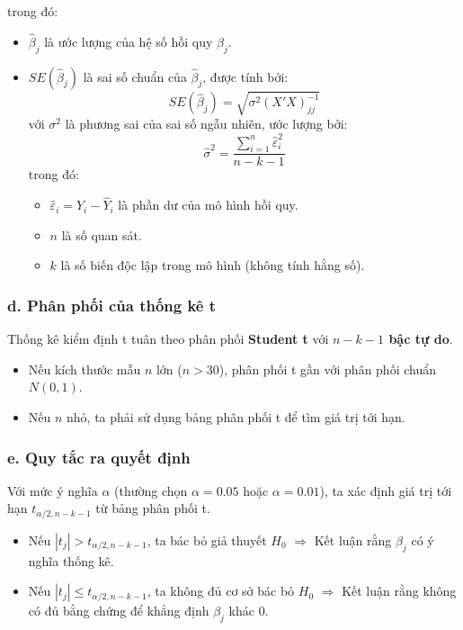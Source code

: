 trong đó:

\begin{itemize}
    \item $\hat{\beta}_j$ là ước lượng của hệ số hồi quy $\beta_j$.
    \item $SE(\hat{\beta}_j)$ là sai số chuẩn của $\hat{\beta}_j$, được tính bởi:
    \begin{equation}
        SE(\hat{\beta}_j) = \sqrt{\sigma^2 (X'X)^{-1}_{jj}}
    \end{equation}
    với $\sigma^2$ là phương sai của sai số ngẫu nhiên, ước lượng bởi:
    \begin{equation}
        \hat{\sigma}^2 = \frac{\sum_{i=1}^{n} \hat{\varepsilon}_i^2}{n - k - 1}
    \end{equation}
    trong đó:
    \begin{itemize}
        \item $\hat{\varepsilon}_i = Y_i - \hat{Y}_i$ là phần dư của mô hình hồi quy.
        \item $n$ là số quan sát.
        \item $k$ là số biến độc lập trong mô hình (không tính hằng số).
    \end{itemize}
\end{itemize}

\subsubsection{d. Phân phối của thống kê t}

Thống kê kiểm định t tuân theo phân phối \textbf{Student t} với \textbf{$n - k - 1$ bậc tự do}.

\begin{itemize}
    \item Nếu kích thước mẫu $n$ lớn ($n > 30$), phân phối t gần với phân phối chuẩn $N(0,1)$.
    \item Nếu $n$ nhỏ, ta phải sử dụng bảng phân phối t để tìm giá trị tới hạn.
\end{itemize}

\subsubsection{e. Quy tắc ra quyết định}

Với mức ý nghĩa $\alpha$ (thường chọn $\alpha = 0.05$ hoặc $\alpha = 0.01$), ta xác định giá trị tới hạn $t_{\alpha/2, n-k-1}$ từ bảng phân phối t.

\begin{itemize}
    \item Nếu $|t_j| > t_{\alpha/2, n-k-1}$, ta bác bỏ giả thuyết $H_0$ $\Rightarrow$ Kết luận rằng $\beta_j$ có ý nghĩa thống kê.
    \item Nếu $|t_j| \leq t_{\alpha/2, n-k-1}$, ta không đủ cơ sở bác bỏ $H_0$ $\Rightarrow$ Kết luận rằng không có đủ bằng chứng để khẳng định $\beta_j$ khác 0.
\end{itemize}

